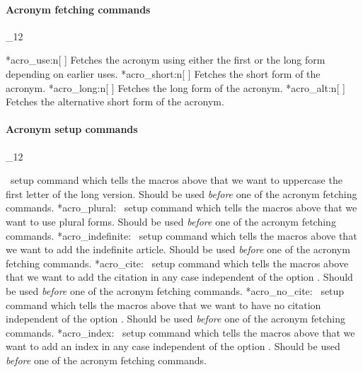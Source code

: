 \documentclass[load-preamble+,scrartcl={DIV10}]{cnltx-doc}
\makeatletter
\renewenvironment{commands}
  {%
    \cnltx@set@catcode_{12}%
    \let\command\cnltx@command
    \cnltxlist
  }
  {\endcnltxlist}
\makeatother
\begin{document}
\paragraph{Acronym fetching commands}
\begin{commands}
  \command*{acro_use:n}[ ]
    Fetches the acronym using either the first or the long form depending on
    earlier uses.
  \command*{acro_short:n}[ ]
    Fetches the short form of the acronym.
  \command*{acro_long:n}[ ]
    Fetches the long form of the acronym.
  \command*{acro_alt:n}[ ]
    Fetches the alternative short form of the acronym.
\end{commands}

\paragraph{Acronym setup commands}
\begin{commands}
  \command*{acro_first_upper:}
    \acro\ setup command which tells the macros above that we want to
    uppercase the first letter of the long version.  Should be used
    \emph{before} one of the acronym fetching commands.
  \command*{acro_plural:}
    \acro\ setup command which tells the macros above that we want to use
    plural forms. Should be used \emph{before} one of the acronym fetching
    commands.
  \command*{acro_indefinite:}
    \acro\ setup command which tells the macros above that we want to add the
    indefinite article.  Should be used \emph{before} one of the acronym
    fetching commands.
  \command*{acro_cite:}
    \acro\ setup command which tells the macros above that we want to add the
    citation in any case independent of the option .  Should be
    used \emph{before} one of the acronym fetching commands.
  \command*{acro_no_cite:}
    \acro\ setup command which tells the macros above that we want to have no
    citation independent of the option .  Should be used
    \emph{before} one of the acronym fetching commands.
  \command*{acro_index:}
    \acro\ setup command which tells the macros above that we want to add an
    index in any case independent of the option .  Should be
    used \emph{before} one of the acronym fetching commands.
\end{commands}
\end{document}

